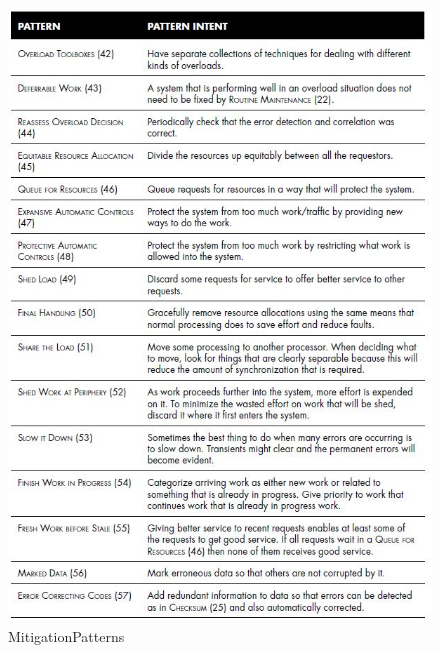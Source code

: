 \begin{figure}[H]
	\centering
	\includegraphics[width=\textwidth]{content/faulttolerance/images/MitigationPatterns.JPG}
	\caption{MitigationPatterns}
\end{figure}



